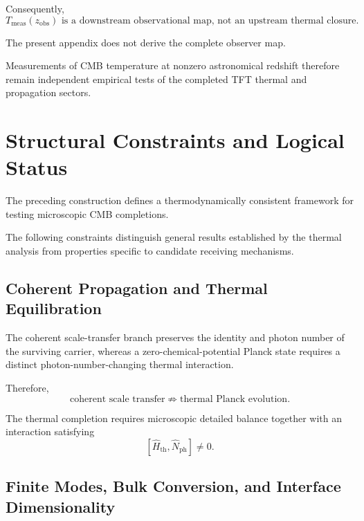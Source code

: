 Consequently,
\begin{equation}
    T_{\mathrm{meas}}(z_{\mathrm{obs}})
    \text{ is a downstream observational map,
    not an upstream thermal closure.}
    \label{eq:AT_temperature_redshift_status}
\end{equation}

The present appendix does not derive the complete observer map.

Measurements of CMB temperature at nonzero astronomical redshift therefore
remain independent empirical tests of the completed TFT thermal and
propagation sectors.


\section{Structural Constraints and Logical Status}

The preceding construction defines a thermodynamically consistent framework
for testing microscopic CMB completions.

The following constraints distinguish general results established by the
thermal analysis from properties specific to candidate receiving mechanisms.


\subsection{Coherent Propagation and Thermal Equilibration}

The coherent scale-transfer branch preserves the identity and photon number
of the surviving carrier, whereas a zero-chemical-potential Planck state
requires a distinct photon-number-changing thermal interaction.

Therefore,
\begin{equation}
    \text{coherent scale transfer}
    \not\Rightarrow
    \text{thermal Planck evolution}.
    \label{eq:AT_constraint_scale_only}
\end{equation}

The thermal completion requires microscopic detailed balance together with
an interaction satisfying
\begin{equation}
    \left[
        \hat H_{\mathrm{th}},
        \hat N_{\mathrm{ph}}
    \right]
    \neq
    0.
\end{equation}


\subsection{Finite Modes, Bulk Conversion, and Interface Dimensionality}

